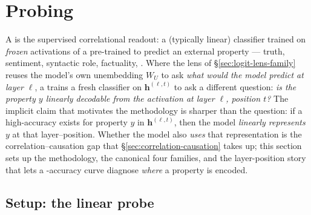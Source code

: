 
\section{Probing}
\label{sec:probing}

A \emph{} is the supervised correlational readout: a (typically
linear) classifier trained on \emph{frozen} activations of a pre-trained
 to predict an external property — truth, sentiment, syntactic
role, factuality, . Where the lens of \S\ref{sec:logit-lens-family}
reuses the model's own unembedding $W_U$ to ask \emph{what would the
model predict at layer $\ell$}, a  trains a fresh classifier on
$\mathbf{h}^{(\ell, t)}$ to ask a different question: \emph{is the
property $y$ linearly decodable from the activation at layer $\ell$,
position $t$?} The implicit claim that motivates the methodology is
sharper than the question: if a high-accuracy  exists for property
$y$ in $\mathbf{h}^{(\ell, t)}$, then the model \emph{linearly
represents} $y$ at that layer–position. Whether the model also
\emph{uses} that representation is the correlation–causation gap that
\S\ref{sec:correlation-causation} takes up; this section sets up the
methodology, the canonical four  families, and the layer-position
story that lets a -accuracy curve diagnose \emph{where} a property
is encoded.

\subsection{Setup: the linear probe}
\label{sec:probe-setup}

